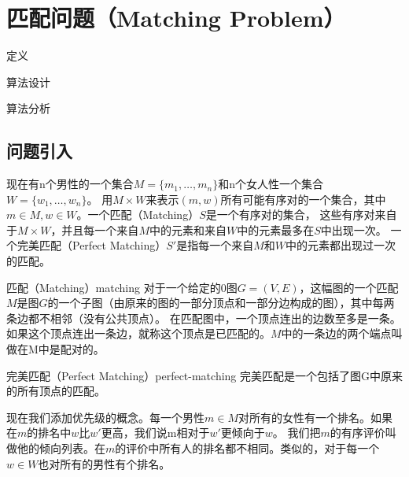 \chapter{匹配问题（Matching Problem）}

\begin{introduction}
    \item 定义
    \item 算法设计
    \item 算法分析
\end{introduction}

\section{问题引入}\label{sec:stable-matching-def}
    现在有n个男性的一个集合$M=\{m_1,\dots,m_n\}$和n个女人性一个集合$W=\{w_1,\dots,w_n\}$。
    用$M\times W$来表示$(m,w)$所有可能有序对的一个集合，其中$m\in M,w\in W$。一个匹配（Matching）$S$是一个有序对的集合，
    这些有序对来自于$M\times W$，并且每一个来自$M$中的元素和来自$W$中的元素最多在$S$中出现一次。
    一个完美匹配（Perfect Matching）$S'$是指每一个来自$M$和$W$中的元素都出现过一次的匹配。
    \begin{definition}{匹配（Matching）}{matching}
        对于一个给定的0图$G=(V,E)$，这幅图的一个匹配$M$是图$G$的一个子图（由原来的图的一部分顶点和一部分边构成的图），其中每两条边都不相邻（没有公共顶点）。
        在匹配图中，一个顶点连出的边数至多是一条。如果这个顶点连出一条边，就称这个顶点是已匹配的。$M$中的一条边的两个端点叫做在M中是配对的。
    \end{definition}
    \begin{definition}{完美匹配（Perfect Matching）}{perfect-matching}
        完美匹配是一个包括了图G中原来的所有顶点的匹配。
    \end{definition}
    现在我们添加优先级的概念。每一个男性$m\in M$对所有的女性有一个排名。如果在$m$的排名中$w$比$w'$更高，我们说m相对于$w'$更倾向于$w$。
    我们把$m$的有序评价叫做他的倾向列表。在$m$的评价中所有人的排名都不相同。类似的，对于每一个$w\in W$也对所有的男性有个排名。

